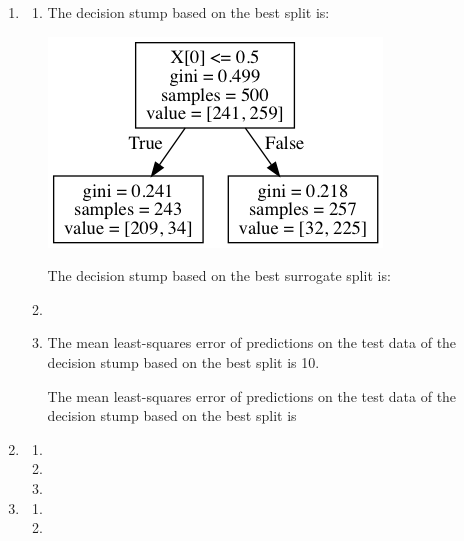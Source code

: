 \documentclass[paper=letter, fontsize=12pt]{article}
\begin{document}
\begin{enumerate}[label=(\alph*)]
	\item 
	\begin{enumerate}[label=(\roman*)]
		\item 
		The decision stump based on the best split is:
		
		\includegraphics[scale=0.6]{tree_best_split.png}
		
		The decision stump based on the best surrogate split is:
		
		
		\item 
		
		\item 
		The mean least-squares error of predictions on the test data of the decision stump based on the best split is 10.
		
		The mean least-squares error of predictions on the test data of the decision stump based on the best split is 
	\end{enumerate}

	\item 
	\begin{enumerate}[label=(\roman*)]
		\item 
		
		\item 
		
		\item 
	\end{enumerate}

	\item 
	\begin{enumerate}[label=(\roman*)]
		\item 
		
		\item
	\end{enumerate}
\end{enumerate}
\end{document}
